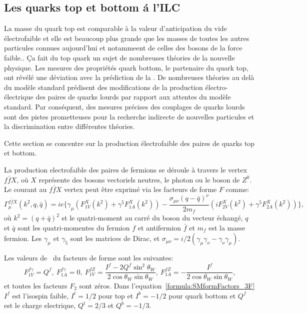 \subsection*{Les quarks top et bottom \'a l'ILC}

La masse du quark top est comparable à la valeur d'anticipation du vide électrofaible et elle est beaucoup plus grande que les masses de toutes les autres particules connues aujourd'hui et notammeent de celles des bosons de la force faible..
\c Ca fait du top quark un sujet de nombreuses théories de la nouvelle physique.
Les mesures des propriétés quark bottom, le partenaire du quark top, ont révélé une déviation avec la prédiction de la \sm.
De nombreuses théories au delà du modèle standard prédisent des modifications de la production électro-électrique des paires de quarks lourds par rapport aux attentes du modèle standard.
Par conséquent, des mesures précises des couplages de quarks lourds sont des pistes prometteuses pour la recherche indirecte de nouvelles particules et la discrimination entre différentes théories.

Cette section se concentre sur la production électrofaible des paires de quarks top et bottom.

La production electrofaible des paires de fermions se déroule à travers le vertex $f\bar{f}X$, où $X$ représente des bosons vectoriels neutres, le photon ou le boson de $Z^0$. Le courant au $f\bar{f}X$ vertex peut être exprimé via les facteurs de forme $F$ comme:
\begin{equation}
\Gamma^{f\bar{f}X}_\mu (k^2,q,\bar{q}) = ie\{ \gamma_\mu (F^X_{1V}(k^2) + \gamma^5 F^X_{1A}(k^2)) - \frac{\sigma_{\mu\nu}(q-\bar{q})^\nu}{2m_f}(iF^X_{2V}(k^2) + \gamma^5 F^X_{2A}(k^2)) \},
\end{equation}
où $k^2= (q+\bar{q})^2$ st le quatri-moment au carré du boson du vecteur échangé, $q$ et $\bar{q} $ sont les quatri-momentes du fermion $f$ et antifermion $\bar{f}$ et $m_f$ est la masse fermion. Les $\gamma_\mu$ et $\gamma_5$ sont les matrices de Dirac, et $\sigma_{\mu\nu} = i/2(\gamma_\mu\gamma_\nu - \gamma_\nu\gamma_\mu)$.

Les valeurs de \sm\ du facteurs de forme sont les suivantes:
\begin{equation}
F^{f\gamma}_{1V} = Q^{f}, \ F^{f\gamma}_{1A} = 0, \ F^{fZ}_{1V} = \frac{I^f - 2Q^f\sin^2\theta_W}{2\cos\theta_W\sin\theta_W}, \ F^{fZ}_{1A} = - \frac{I^f}{2\cos\theta_W\sin\theta_W},
\label{formula:SMformFactors_3F}
\end{equation}
et toutes les facteurs $F_2$ sont zéros. Dans l'equation~\ref{formula:SMformFactors_3F} $I^f$ est  l'isospin faible, $I^t = 1/2$ pour top et $I^b = -1/2$ pour quark bottom  et $Q^f$ est le charge electrique, $Q^t = 2/3$ et $Q^b = -1/3$.

